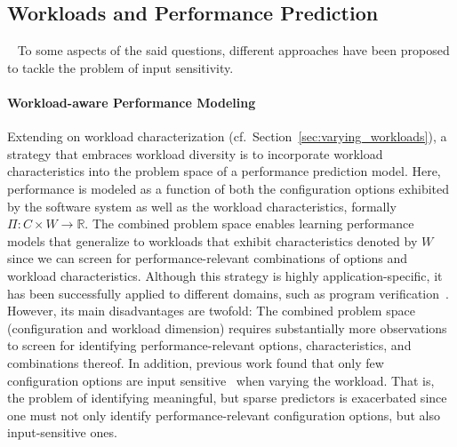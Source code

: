 {
	
\subsection{Workloads and Performance Prediction} ~\label{sec:strategies}
To some aspects of the said questions, different approaches have been proposed to tackle the problem of input sensitivity.

\paragraph{Workload-aware Performance Modeling}
\label{sec:workload-aware}
Extending on workload characterization (cf.~Section~\ref{sec:varying_workloads}), a strategy that embraces workload diversity is to incorporate workload characteristics into the problem space of a performance prediction model. Here, performance is modeled as a function of both the configuration options exhibited by the software system as well as the workload characteristics, formally $\Pi: C \times W \rightarrow \mathbb{R}$.
The combined problem space enables learning performance models that generalize to workloads that exhibit characteristics denoted by $W$ since we can screen for performance-relevant combinations of options and workload characteristics. Although this strategy is highly application-specific, it has been successfully applied to different domains, such as program verification~\cite{koc_satune_2021}. However, its main disadvantages are twofold: The combined problem space (configuration and workload dimension) requires substantially more observations to screen for identifying performance-relevant options, characteristics, and combinations thereof. In addition, previous work  found that  only few configuration options are input sensitive~\cite{jamishidi_transfer_2017} when varying the workload. That is, the problem of identifying meaningful, but sparse predictors is exacerbated since one must not only identify performance-relevant configuration options, but also input-sensitive ones.

}
